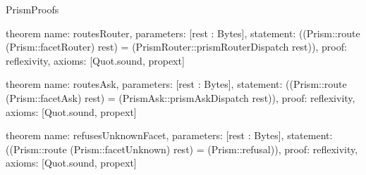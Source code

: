 \begin{lexlean}{PrismProofs}
\begin{semanticmodule}
theorem{
  name: routesRouter,
  parameters: [rest : Bytes],
  statement: ((Prism::route (Prism::facetRouter) rest) = (PrismRouter::prismRouterDispatch rest)),
  proof: reflexivity{},
  axioms: [Quot.sound, propext]
}

theorem{
  name: routesAsk,
  parameters: [rest : Bytes],
  statement: ((Prism::route (Prism::facetAsk) rest) = (PrismAsk::prismAskDispatch rest)),
  proof: reflexivity{},
  axioms: [Quot.sound, propext]
}

theorem{
  name: refusesUnknownFacet,
  parameters: [rest : Bytes],
  statement: ((Prism::route (Prism::facetUnknown) rest) = (Prism::refusal)),
  proof: reflexivity{},
  axioms: [Quot.sound, propext]
}
\end{semanticmodule}
\end{lexlean}
